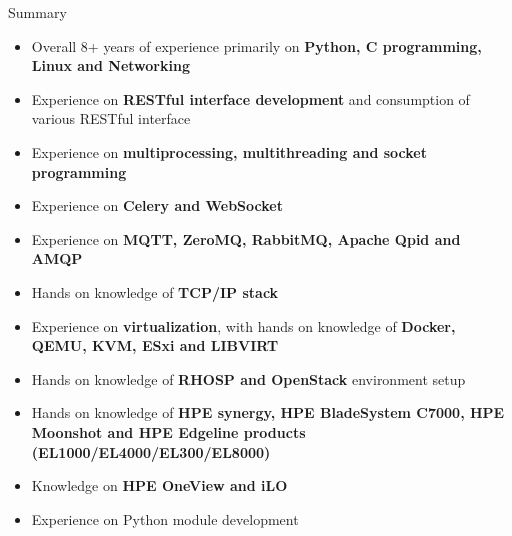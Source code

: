 \documentclass{resume} %
\begin{document}
  



\begin{rSection}{Summary}
\begin{itemize}
\setlength\itemsep{-1pt}
\item Overall 8+ years of experience primarily on \textbf{Python, C programming, Linux and Networking}
\item Experience on \textbf{RESTful interface development} and consumption of various RESTful interface
\item Experience on \textbf{multiprocessing, multithreading and socket programming}
\item Experience on \textbf{Celery and WebSocket}
\item Experience on \textbf{MQTT, ZeroMQ, RabbitMQ, Apache Qpid and AMQP}
\item Hands on knowledge of \textbf{TCP/IP stack}
\item Experience on \textbf{virtualization}, with hands on knowledge of \textbf{Docker, QEMU, KVM, ESxi and LIBVIRT}
\item Hands on knowledge of \textbf{RHOSP and OpenStack} environment setup
\item Hands on knowledge of \textbf{HPE synergy, HPE BladeSystem C7000, HPE Moonshot and HPE Edgeline products (EL1000/EL4000/EL300/EL8000)}
\item Knowledge on \textbf{HPE OneView and iLO}
\item Experience on Python module development
\end{itemize}



\end{rSection}

\end{document}
